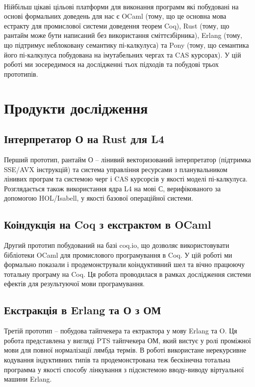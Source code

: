 \paragraph{}
Нійбільш цікаві цільові платформи для виконання программ
які побудовані на основі формальних доведень для нас є OCaml (тому,
що це основна мова естракту для промислової системи доведення теорем Coq),
Rust (тому, що рантайм може бути написаний без використання сміттєзбірника),
Erlang (тому, що підтримує неблоковану семантику пі-калкулуса)
та Pony (тому, що семантика його пі-калкулуса побудована на імутабельних чергах та CAS курсорах).
У цій роботі ми зосередимося на дослідженні тьох підходів
та побудові трьох прототипів.



\newpage
\section{Продукти дослідження}

\subsection{Інтерпретатор О на Rust для L4}
Перший прототип, рантайм О -- лінивий
векторизований інтерпретатор (підтримка SSE/AVX інструкцій) та система
управління ресурсами з планувальником лінивих програм
та системою черг і CAS курсорсів у якості моделі пі-калкулуса. Розглядається також
використання ядра L4 на мові С, верифікованого за допомогою HOL/Isabell,
у якості базової операційної системи.

\subsection{Коіндукція на Coq з екстрактом в OCaml}
Другий прототип побудований на базі coq.io, що дозволяє
використовувати бібліотеки OCaml для промислового програмування в Coq.
У цій роботі ми формально показали і продемонстрували коіндуктивний шел
та вічно працюючу тотальну програму на Coq. Ця робота проводилася
в рамках дослідження системи ефектів для результуючої мови програмування.

\subsection{Екстракція в Erlang та О з ОМ}
Третій прототип -- побудова тайпчекера та ектрактора у мову Erlang та O.
Ця робота представлена у вигляді PTS тайпчекера ОМ, який вистує у ролі
проміжної мови для повної нормалізації лямбда термів. В роботі використане
нерекурсивне кодування індуктивних типів та продемонстрована теж бескінечна
тотальна программа у якості способу лінкування з підсистемою вводу-виводу
віртуальної машини Erlang.

